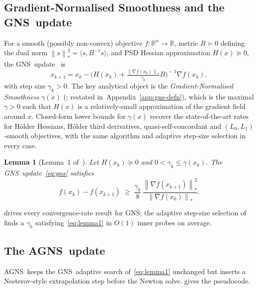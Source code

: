 \documentclass[conference]{IEEEtran}
\newtheorem{lemma}[theorem]{Lemma}
\theoremstyle{remark}
\newcommand{\R}{\mathbb{R}}
\newcommand{\dnorm}[1]{\left\lVert#1\right\rVert_*}
\newcommand{\AGNS}{\textsc{AGNS}}
\newcommand{\GNS}{\textsc{GNS}}
\begin{document}
\subsection{Gradient-Normalised Smoothness and the \GNS\ update}

For a smooth (possibly non-convex) objective $f \colon \R^n \to \R$,
metric $B \succ 0$ defining the dual norm $\dnorm{s}^2 = \langle s,
B^{-1}s\rangle$, and PSD Hessian approximation $H(x) \succeq 0$, the
\GNS\ update~\cite{semenov2025gradient} is
\begin{equation}
\label{eq:gns}
x_{k+1} = x_k - \Big(H(x_k) + \tfrac{\dnorm{\nabla f(x_k)}}{\gamma_k} B\Big)^{\!-1}\!\nabla f(x_k),
\end{equation}
with step size $\gamma_k > 0$. The key analytical object is the
\emph{Gradient-Normalised Smoothness} $\gamma(x)$ (\cite[Def.~1]{semenov2025gradient};
restated in~Appendix~\ref{app:gns-defn}), which is the maximal
$\gamma > 0$ such that $H(x)$ is a relatively-small approximation of
the gradient field around $x$. Closed-form lower bounds for
$\gamma(x)$ recover the state-of-the-art rates for H\"older Hessians,
H\"older third derivatives, quasi-self-concordant and
$(L_0,L_1)$-smooth objectives, with the same algorithm and adaptive
step-size selection in every case.

\begin{lemma}[Lemma~1 of~\cite{semenov2025gradient}]
\label{lem:lemma1}
Let $H(x_k) \succeq 0$ and $0 < \gamma_k \le \gamma(x_k)$. The
\GNS\ update~\eqref{eq:gns} satisfies
\begin{equation}
\label{eq:lemma1}
f(x_k) - f(x_{k+1}) \;\geq\; \frac{\gamma_k}{8}\,
  \frac{\dnorm{\nabla f(x_{k+1})}^2}{\dnorm{\nabla f(x_k)}}.
\end{equation}
\end{lemma}

 drives every convergence-rate result for \GNS;
the adaptive step-size selection of \cite[Alg.~3]{semenov2025gradient}
finds a $\gamma_k$ satisfying~\eqref{eq:lemma1} in $O(1)$ inner probes
on average.

\subsection{The \AGNS\ update}

\AGNS\ keeps the \GNS\ adaptive search of~\eqref{eq:lemma1} unchanged
but inserts a Nesterov-style extrapolation step before the Newton
solve.  gives the pseudocode.
\end{document}
